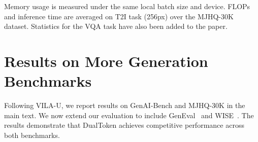 Memory usage is measured under the same local batch size and device. FLOPs and inference time are averaged on T2I task (256px) over the MJHQ-30K dataset. Statistics for the VQA task have also been added to the paper.


\section{Results on More Generation Benchmarks}
\label{appendix_genbench}

Following VILA-U, we report results on GenAI-Bench and MJHQ-30K in the main text. We now extend our evaluation to include GenEval~\citep{ghosh2023geneval} and WISE~\citep{niu2025wise}. The results demonstrate that DualToken achieves competitive performance across both benchmarks.

\begin{table}[ht]
\centering
\caption{Evaluation results on GenEval and WISE benchmarks.}
\label{tab:geneval-wise}
\end{table}


